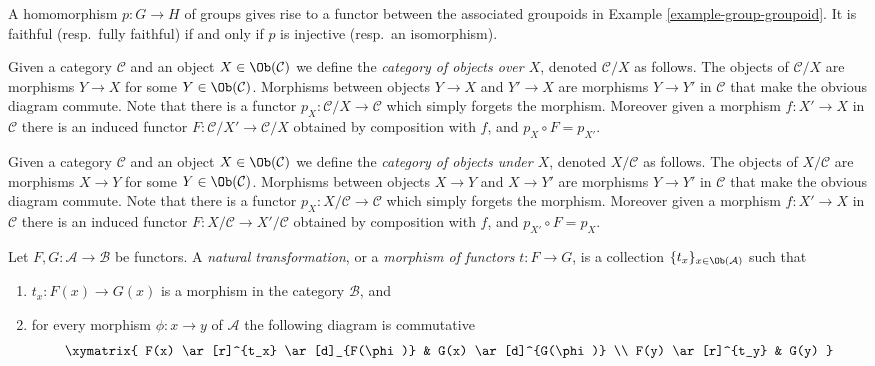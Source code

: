 \begin{example}
\label{example-group-homorphism-functor}
A homomorphism $p : G\to H$ of groups gives rise to a functor
between the associated groupoids in Example \ref{example-group-groupoid}. It is
faithful (resp.\ fully faithful) if and only if $p$ is injective (resp.\ an
isomorphism).
\end{example}

\begin{example}
\label{example-category-over-X}
Given a category $\mathcal{C}$ and an object $X\in \Ob(\mathcal{C})$
we define the {\it category of objects over $X$},
denoted $\mathcal{C}/X$ as follows.
The objects of $\mathcal{C}/X$ are morphisms $Y\to X$ for
some $Y\in \Ob(\mathcal{C})$. Morphisms between objects
$Y\to X$ and $Y'\to X$ are morphisms $Y\to Y'$ in $\mathcal{C}$ that
make the obvious diagram commute.  Note that there is a functor
$p_X : \mathcal{C}/X\to \mathcal{C}$ which simply forgets the
morphism.  Moreover given a morphism $f : X'\to X$ in
$\mathcal{C}$ there is an induced functor
$F : \mathcal{C}/X' \to \mathcal{C}/X$ obtained by composition with $f$,
and $p_X\circ F = p_{X'}$.
\end{example}

\begin{example}
\label{example-category-under-X}
Given a category $\mathcal{C}$ and an object $X\in \Ob(\mathcal{C})$
we define the {\it category of objects under $X$},
denoted $X/\mathcal{C}$ as follows.
The objects of $X/\mathcal{C}$ are morphisms $X\to Y$ for
some $Y\in \Ob(\mathcal{C})$. Morphisms between objects
$X\to Y$ and $X\to Y'$ are morphisms $Y\to Y'$ in $\mathcal{C}$ that
make the obvious diagram commute.  Note that there is a functor
$p_X : X/\mathcal{C}\to \mathcal{C}$ which simply forgets the
morphism.  Moreover given a morphism $f : X'\to X$ in
$\mathcal{C}$ there is an induced functor
$F : X/\mathcal{C} \to X'/\mathcal{C}$
obtained by composition with $f$,
and $p_{X'}\circ F = p_X$.
\end{example}




\begin{definition}
\label{definition-transformation-functors}
Let $F, G : \mathcal{A} \to \mathcal{B}$ be functors.
A {\it natural transformation}, or a {\it morphism of functors}
$t : F \to G$, is a collection $\{t_x\}_{x\in \Ob(\mathcal{A})}$
such that
\begin{enumerate}
\item $t_x : F(x) \to G(x)$ is a morphism in the category $\mathcal{B}$, and
\item for every morphism $\phi : x \to y$ of $\mathcal{A}$ the following
diagram is commutative
$$
\xymatrix{
F(x) \ar[r]^{t_x} \ar[d]_{F(\phi)} & G(x) \ar[d]^{G(\phi)} \\
F(y) \ar[r]^{t_y} & G(y) }
$$
\end{enumerate}
\end{definition}

